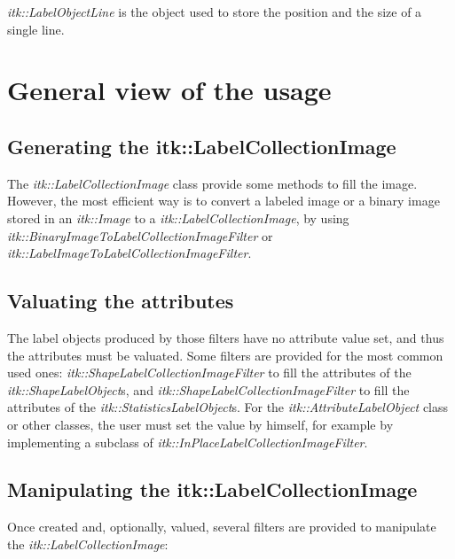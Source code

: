 \documentclass{InsightArticle}
\begin{document}
{\em itk::LabelObjectLine} is the object used to store the position and the size
of a single line.

\section{General view of the usage}

\subsection{Generating the itk::LabelCollectionImage}

The {\em itk::LabelCollectionImage} class provide some methods to fill the
image. However, the most efficient way is to convert a labeled image or a binary
image stored in an {\em itk::Image} to a {\em itk::LabelCollectionImage}, by
using {\em itk::BinaryImageToLabelCollectionImageFilter} or {\em
itk::LabelImageToLabelCollectionImageFilter}.

\subsection{Valuating the attributes}

The label objects produced by those filters have no attribute value set, and
thus the attributes must be valuated. Some filters are provided for the most
common used ones: {\em itk::ShapeLabelCollectionImageFilter} to fill the
attributes of the {\em itk::ShapeLabelObject}s, and {\em
itk::ShapeLabelCollectionImageFilter} to fill the attributes of the {\em
itk::StatisticsLabelObject}s. For the {\em itk::AttributeLabelObject} class or
other classes, the user must set the value by himself, for example by
implementing a subclass of {\em itk::InPlaceLabelCollectionImageFilter}.

\subsection{Manipulating the itk::LabelCollectionImage}

Once created and, optionally, valued, several filters are provided to manipulate
the {\em itk::LabelCollectionImage}:
\end{document}
